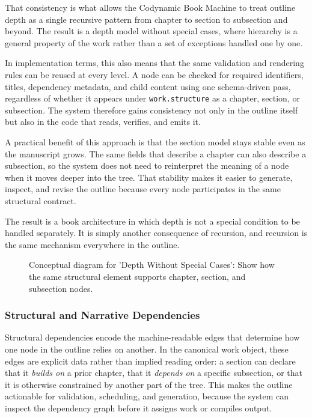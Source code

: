 \documentclass[11pt]{article}
\begin{document}
That consistency is what allows the Codynamic Book Machine to treat outline depth as a single recursive pattern from chapter to section to subsection and beyond. The result is a depth model without special cases, where hierarchy is a general property of the work rather than a set of exceptions handled one by one.

In implementation terms, this also means that the same validation and rendering rules can be reused at every level. A node can be checked for required identifiers, titles, dependency metadata, and child content using one schema-driven pass, regardless of whether it appears under \texttt{work.structure} as a chapter, section, or subsection. The system therefore gains consistency not only in the outline itself but also in the code that reads, verifies, and emits it.

A practical benefit of this approach is that the section model stays stable even as the manuscript grows. The same fields that describe a chapter can also describe a subsection, so the system does not need to reinterpret the meaning of a node when it moves deeper into the tree. That stability makes it easier to generate, inspect, and revise the outline because every node participates in the same structural contract.

The result is a book architecture in which depth is not a special condition to be handled separately. It is simply another consequence of recursion, and recursion is the same mechanism everywhere in the outline.

\begin{figure}[htbp]
\centering

\caption{Conceptual diagram for 'Depth Without Special Cases': Show how the same structural element supports chapter, section, and subsection nodes.}
\end{figure}



\subsubsection{Structural and Narrative Dependencies}


Structural dependencies encode the machine-readable edges that determine how one node in the outline relies on another. In the canonical work object, these edges are explicit data rather than implied reading order: a section can declare that it \emph{builds on} a prior chapter, that it \emph{depends on} a specific subsection, or that it is otherwise constrained by another part of the tree. This makes the outline actionable for validation, scheduling, and generation, because the system can inspect the dependency graph before it assigns work or compiles output.
\end{document}
